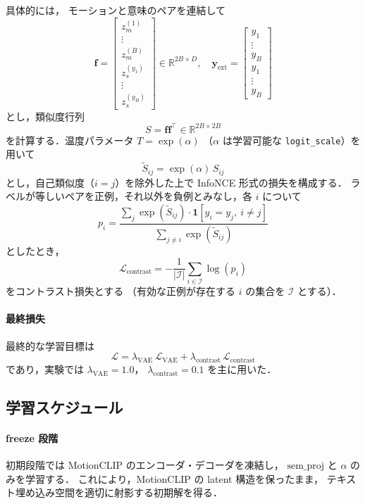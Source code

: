 \documentclass[a4paper,10pt]{jsarticle}
\begin{document}
具体的には，
モーションと意味のペアを連結して
\[
\mathbf{f} =
\begin{bmatrix}
z_m^{(1)} \\ \vdots \\ z_m^{(B)} \\
z_s^{(y_1)} \\ \vdots \\ z_s^{(y_B)}
\end{bmatrix}
\in \mathbb{R}^{2B \times D},
\quad
\mathbf{y}_{\mathrm{ext}} =
\begin{bmatrix}
y_1 \\ \vdots \\ y_B \\
y_1 \\ \vdots \\ y_B
\end{bmatrix}
\]
とし，類似度行列
\[
S = \mathbf{f} \mathbf{f}^\top \in \mathbb{R}^{2B \times 2B}
\]
を計算する．温度パラメータ $T = \exp(\alpha)$
（$\alpha$ は学習可能な \texttt{logit\_scale}）を用いて
\[
\tilde{S}_{ij} = \exp(\alpha)\, S_{ij}
\]
とし，自己類似度（$i=j$）を除外した上で InfoNCE 形式の損失を構成する．
ラベルが等しいペアを正例，それ以外を負例とみなし，各 $i$ について
\[
p_i = 
\frac{\sum_j \exp(\tilde{S}_{ij}) \cdot \mathbf{1}[y_i = y_j,\ i\neq j]}
     {\sum_{j\neq i} \exp(\tilde{S}_{ij})}
\]
としたとき，
\[
\mathcal{L}_{\mathrm{contrast}}
= -\frac{1}{|\mathcal{I}|} \sum_{i \in \mathcal{I}} \log(p_i)
\]
をコントラスト損失とする
（有効な正例が存在する $i$ の集合を $\mathcal{I}$ とする）．

\paragraph{最終損失}
最終的な学習目標は
\[
\mathcal{L}
= \lambda_{\mathrm{VAE}}\,\mathcal{L}_{\mathrm{VAE}}
+ \lambda_{\mathrm{contrast}}\,\mathcal{L}_{\mathrm{contrast}}
\]
であり，実験では $\lambda_{\mathrm{VAE}}=1.0$，
$\lambda_{\mathrm{contrast}}=0.1$ を主に用いた．

\subsection{学習スケジュール}

\paragraph{freeze 段階}
初期段階では MotionCLIP のエンコーダ・デコーダを凍結し，
$\mathrm{sem\_proj}$ と $\alpha$ のみを学習する．
これにより，MotionCLIP の latent 構造を保ったまま，
テキスト埋め込み空間を適切に射影する初期解を得る．
\end{document}
